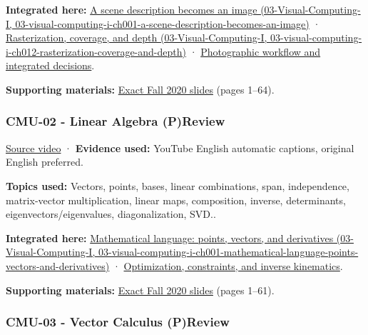 \textbf{Integrated here:} \href{../03-Visual-Computing-I/main.pdf\#nameddest=03-visual-computing-i-ch001-a-scene-description-becomes-an-image}{A scene description becomes an image (03-Visual-Computing-I, 03-visual-computing-i-ch001-a-scene-description-becomes-an-image)} · \href{../03-Visual-Computing-I/main.pdf\#nameddest=03-visual-computing-i-ch012-rasterization-coverage-and-depth}{Rasterization, coverage, and depth (03-Visual-Computing-I, 03-visual-computing-i-ch012-rasterization-coverage-and-depth)} · \hyperref[04-visual-computing-ii-ch034-photographic-workflow-and-integrated-decisions]{Photographic workflow and integrated decisions}.

\textbf{Supporting materials:} \href{https://15462.courses.cs.cmu.edu/fall2020content/lectures/01_intro/01_intro_slides.pdf}{Exact Fall 2020 slides} (pages 1--64).

\subsubsection{CMU-02 - Linear Algebra (P)Review}\label{04-visual-computing-ii-ch036-cmu-02---linear-algebra-preview}

\href{https://www.youtube.com/watch?v=2c8XQlQApx8}{Source video} · \textbf{Evidence used:} YouTube English automatic captions, original English preferred.

\textbf{Topics used:} Vectors, points, bases, linear combinations, span, independence, matrix-vector multiplication, linear maps, composition, inverse, determinants, eigenvectors/eigenvalues, diagonalization, SVD..

\textbf{Integrated here:} \href{../03-Visual-Computing-I/main.pdf\#nameddest=03-visual-computing-i-ch001-mathematical-language-points-vectors-and-derivatives}{Mathematical language: points, vectors, and derivatives (03-Visual-Computing-I, 03-visual-computing-i-ch001-mathematical-language-points-vectors-and-derivatives)} · \hyperref[04-visual-computing-ii-ch029-optimization-constraints-and-inverse-kinematics]{Optimization, constraints, and inverse kinematics}.

\textbf{Supporting materials:} \href{https://15462.courses.cs.cmu.edu/fall2020content/lectures/02_linearalgebra/02_linearalgebra_slides.pdf}{Exact Fall 2020 slides} (pages 1--61).

\subsubsection{CMU-03 - Vector Calculus (P)Review}\label{04-visual-computing-ii-ch036-cmu-03---vector-calculus-preview}

